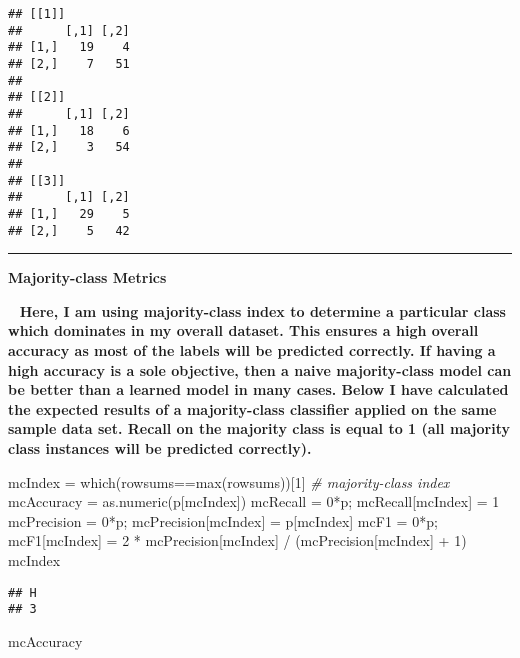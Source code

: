 \documentclass[
]{article}
\newenvironment{Shaded}{\begin{snugshade}}{\end{snugshade}}
\newcommand{\CommentTok}[1]{\textcolor[rgb]{0.56,0.35,0.01}{\textit{#1}}}
\newcommand{\DecValTok}[1]{\textcolor[rgb]{0.00,0.00,0.81}{#1}}
\newcommand{\FunctionTok}[1]{\textcolor[rgb]{0.00,0.00,0.00}{#1}}
\newcommand{\NormalTok}[1]{#1}
\newcommand{\OtherTok}[1]{\textcolor[rgb]{0.56,0.35,0.01}{#1}}
\newcommand{\SpecialCharTok}[1]{\textcolor[rgb]{0.00,0.00,0.00}{#1}}
\begin{document}
\begin{verbatim}
## [[1]]
##      [,1] [,2]
## [1,]   19    4
## [2,]    7   51
## 
## [[2]]
##      [,1] [,2]
## [1,]   18    6
## [2,]    3   54
## 
## [[3]]
##      [,1] [,2]
## [1,]   29    5
## [2,]    5   42
\end{verbatim}

\begin{center}\rule{0.5\linewidth}{0.5pt}\end{center}

\textbf{Majority-class Metrics}

~ \textbf{Here, I am using majority-class index to determine a
particular class which dominates in my overall dataset. This ensures a
high overall accuracy as most of the labels will be predicted correctly.
If having a high accuracy is a sole objective, then a naive
majority-class model can be better than a learned model in many cases.
Below I have calculated the expected results of a majority-class
classifier applied on the same sample data set. Recall on the majority
class is equal to 1 (all majority class instances will be predicted
correctly).}

\begin{Shaded}
\begin{Highlighting}[]
\NormalTok{mcIndex }\OtherTok{=} \FunctionTok{which}\NormalTok{(rowsums}\SpecialCharTok{==}\FunctionTok{max}\NormalTok{(rowsums))[}\DecValTok{1}\NormalTok{] }\CommentTok{\# majority{-}class index}
\NormalTok{mcAccuracy }\OtherTok{=} \FunctionTok{as.numeric}\NormalTok{(p[mcIndex]) }
\NormalTok{mcRecall }\OtherTok{=} \DecValTok{0}\SpecialCharTok{*}\NormalTok{p;  mcRecall[mcIndex] }\OtherTok{=} \DecValTok{1}
\NormalTok{mcPrecision }\OtherTok{=} \DecValTok{0}\SpecialCharTok{*}\NormalTok{p; mcPrecision[mcIndex] }\OtherTok{=}\NormalTok{ p[mcIndex]}
\NormalTok{mcF1 }\OtherTok{=} \DecValTok{0}\SpecialCharTok{*}\NormalTok{p; mcF1[mcIndex] }\OtherTok{=} \DecValTok{2} \SpecialCharTok{*}\NormalTok{ mcPrecision[mcIndex] }\SpecialCharTok{/}\NormalTok{ (mcPrecision[mcIndex] }\SpecialCharTok{+} \DecValTok{1}\NormalTok{)}
\NormalTok{mcIndex}
\end{Highlighting}
\end{Shaded}

\begin{verbatim}
## H 
## 3
\end{verbatim}

\begin{Shaded}
\begin{Highlighting}[]
\NormalTok{mcAccuracy}
\end{Highlighting}
\end{Shaded}
\end{document}

